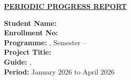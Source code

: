 \pagestyle{NFSUPageHFStyle}
\NFSUWatermarkOn

{\centering
	\par
	\large \textbf{\underline{PERIODIC PROGRESS REPORT}} \par
}\vspace{0.7cm}

\noindent\textbf{Student Name:} \StudentName \\
\noindent\textbf{Enrollment No:} \EnrollmentNo \\
\noindent\textbf{Programme:} \ProgramName, Semester -- \ProgramSemester \\
\noindent\textbf{Project Title:} \ProjectTitle \\
\noindent\textbf{Guide:} \SupervisorName, \SupervisorDesig \\
\noindent\textbf{Period:} January 2026 to April 2026 \\

\vspace{0.5cm}

